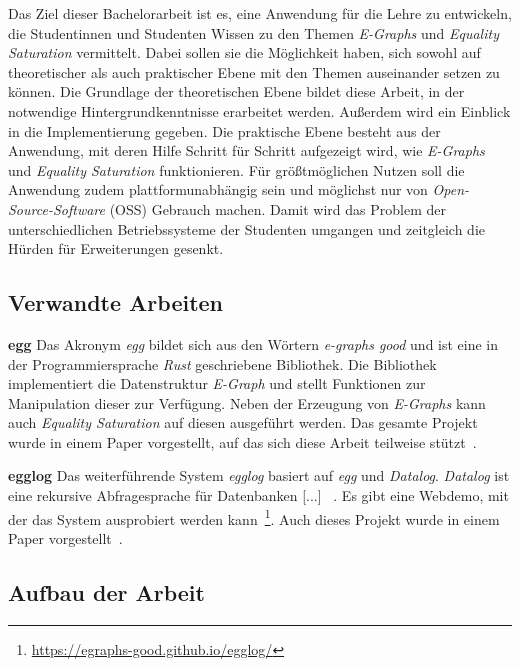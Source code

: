 Das Ziel dieser Bachelorarbeit ist es, eine Anwendung für die Lehre zu entwickeln, die Studentinnen und Studenten Wissen zu den Themen \textit{E-Graphs} und \textit{Equality Saturation}
vermittelt. Dabei sollen sie die Möglichkeit haben, sich sowohl auf theoretischer als auch praktischer Ebene mit den Themen auseinander setzen zu können.
Die Grundlage der theoretischen Ebene bildet diese Arbeit, in der notwendige Hintergrundkenntnisse erarbeitet werden. Außerdem wird ein Einblick in die Implementierung gegeben. 
Die praktische Ebene besteht aus der Anwendung, mit deren Hilfe Schritt für Schritt aufgezeigt wird, wie \textit{E-Graphs} und \textit{Equality Saturation} funktionieren.
Für grö{\ss}tmöglichen Nutzen soll die Anwendung zudem plattformunabhängig sein und möglichst nur von \textit{Open-Source-Software} (OSS) Gebrauch machen.
Damit wird das Problem der unterschiedlichen Betriebssysteme der Studenten umgangen und zeitgleich die Hürden für Erweiterungen gesenkt.

\subsection{Verwandte Arbeiten}\label{sub:verwandtearbeiten}

\noindent\textbf{egg} Das Akronym \textit{egg} bildet sich aus den Wörtern \textit{e-graphs good} und ist eine in der Programmiersprache \textit{Rust} geschriebene Bibliothek.
Die Bibliothek implementiert die Datenstruktur \textit{E-Graph} und stellt Funktionen zur Manipulation dieser zur Verfügung.
Neben der Erzeugung von \textit{E-Graphs} kann auch \textit{Equality Saturation} auf diesen ausgeführt werden.
Das gesamte Projekt wurde in einem Paper vorgestellt, auf das sich diese Arbeit teilweise stützt~\cite{2021-egg}.

\noindent\textbf{egglog} Das weiterführende System \textit{egglog} basiert auf \textit{egg} und \textit{Datalog}. 
\textit{Datalog} ist eine \glqq [...] rekursive Abfragesprache für Datenbanken [...] \grqq~\cite{2023-egglog}.
Es gibt eine Webdemo, mit der das System ausprobiert werden kann~\footnote{\hspace{1.5mm}\url{https://egraphs-good.github.io/egglog/}}.
Auch dieses Projekt wurde in einem Paper vorgestellt~\cite{2023-egglog}.


\subsection{Aufbau der Arbeit}

